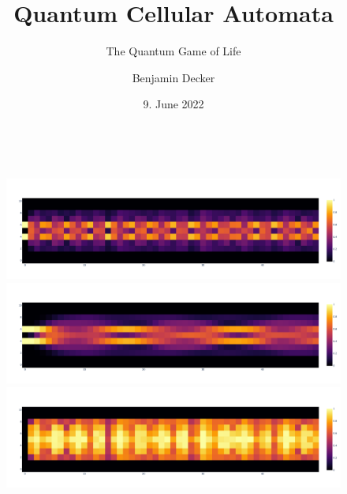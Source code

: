 \documentclass[aspectratio=169]{beamer}
\title{Quantum Cellular Automata}
\subtitle{The Quantum Game of Life}
\author{Benjamin Decker}
\institute[]{Technical University of Munich}
\date{9. June 2022}
\begin{document}
\begin{frame}
\begin{columns}
\titlepage
{}
\begin{figure}
    \centering
    \includegraphics[width=\columnwidth]{graphics/blinker.png}
    \includegraphics[width=\columnwidth]{graphics/blinker_slow.png}
    \includegraphics[width=\columnwidth]{graphics/blinker_sse.png}
\end{figure}
\end{columns}
\end{frame}
\end{document}
